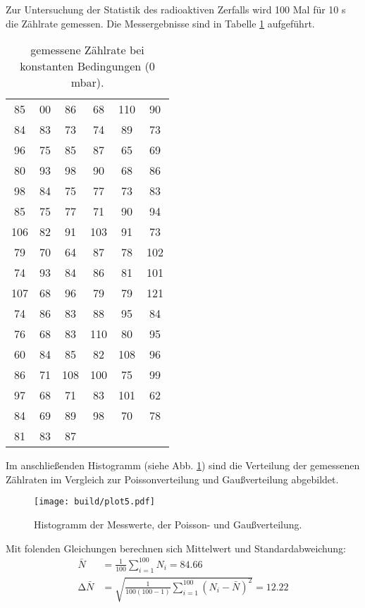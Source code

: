 Zur Untersuchung der Statistik des radioaktiven Zerfalls wird 100 Mal für 10 s die Zählrate gemessen.
Die Messergebnisse sind in Tabelle \ref{tab:M3} aufgeführt.
\begin{table}
  \centering
  \caption{gemessene Zählrate bei konstanten Bedingungen (0 mbar).}
  \label{tab:M3}
  \begin{tabular}{c c c c c c}
    \toprule
    \midrule
  85 & 00 &   86 &  68 & 110 &  90 \\
  84 & 83 &   73 &  74 &  89 &  73 \\
  96 & 75 &   85 &  87 &  65 &  69 \\
  80 & 93 &   98 &  90 &  68 &  86 \\
  98 & 84 &   75 &  77 &  73 &  83 \\
  85 & 75 &   77 &  71 &  90 &  94 \\
 106 & 82 &   91 & 103 &  91 &  73 \\
  79 & 70 &   64 &  87 &  78 & 102 \\
  74 & 93 &   84 &  86 &  81 & 101 \\
 107 & 68 &   96 &  79 &  79 & 121 \\
  74 & 86 &   83 &  88 &  95 &  84 \\
  76 & 68 &   83 & 110 &  80 &  95 \\
  60 & 84 &   85 &  82 & 108 &  96 \\
  86 & 71 &  108 & 100 &  75 &  99 \\
  97 & 68 &   71 &  83 & 101 &  62 \\
  84 & 69 &   89 &  98 &  70 &  78 \\
  81 & 83 &   87 & & & \\
    \bottomrule
  \end{tabular}
\end{table}
Im anschließenden Histogramm (siehe Abb. \ref{fig:plot5}) sind die Verteilung der gemessenen Zählraten im Vergleich zur Poissonverteilung und Gaußverteilung abgebildet.
\begin{figure}
  \centering
  \texttt{[image: build/plot5.pdf]}
  \caption{Histogramm der Messwerte, der Poisson- und Gaußverteilung.}
  \label{fig:plot5}
\end{figure}
Mit folenden Gleichungen berechnen sich Mittelwert und Standardabweichung:
\begin{align}
  \bar N &= \frac{1}{100} \sum_{i=1}^100 N_i = 84.66 \\
  \increment \bar N &= \sqrt{\frac{1}{100(100-1)} \sum_{i=1}^{100} (N_i- \bar N)^2} = 12.22
\end{align}

